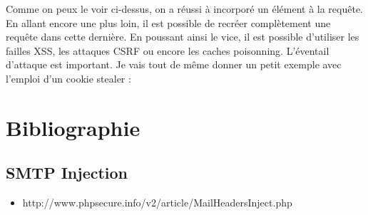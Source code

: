 \documentclass{article}
\begin{document}
Comme on peux le voir ci-dessus, on a réussi à incorporé un élément à la requête. En allant encore une plus loin, il est possible de recréer complètement une requête dans cette dernière. En poussant ainsi le vice, il est possible d'utiliser les failles XSS, les attaques CSRF ou encore les caches poisonning. L'éventail d'attaque est important. Je vais tout de même donner un petit exemple avec l'emploi d'un cookie stealer :
\vspace{0.2cm}\\
\vspace{0.2cm}


\newpage
\section{Bibliographie}
\subsection{SMTP Injection}
\begin{itemize}
\item http://www.phpsecure.info/v2/article/MailHeadersInject.php
\end{itemize}
\end{document}
